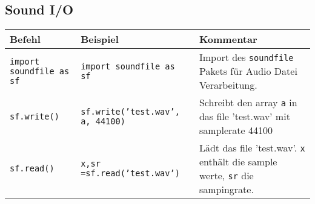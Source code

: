 \subsection*{Sound I/O}
\begin{table}[H]
    \centering
    \begin{tabular}{|p{3cm}|p{6cm}|p{6cm}|}
        \hline
    \textbf{Befehl} & \textbf{Beispiel} & \textbf{Kommentar} \\ \hline
    
    \texttt{import soundfile as sf} & \texttt{import soundfile as sf} & Import des \texttt{soundfile} Pakets für Audio Datei Verarbeitung. \\ \hline
    \texttt{sf.write()} & \texttt{sf.write('test.wav', a, 44100)} & Schreibt den array \texttt{a} in das file 'test.wav' mit samplerate 44100 \\ \hline
    \texttt{sf.read()} & \texttt{x,sr =sf.read('test.wav')} & Lädt das file 'test.wav'. \texttt{x} enthält die sample werte, \texttt{sr} die sampingrate. \\ \hline

    \end{tabular}
\end{table}
